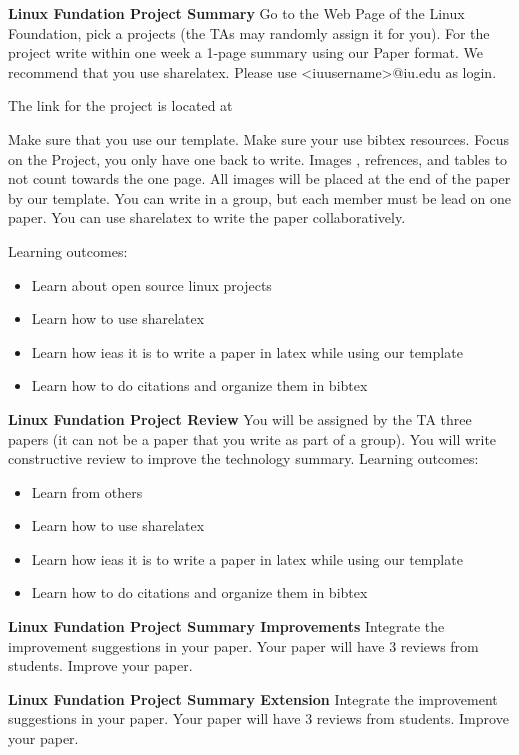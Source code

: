 \begin{exercise} {\bf Linux Fundation Project Summary} 
Go to the Web Page of the Linux Foundation, pick a projects (the TAs
may randomly assign it for you). For the project write within
one week a 1-page summary using our Paper format. We recommend that
you use sharelatex. Please use <iuusername>@iu.edu as login. 

The link for the project is located at

Make sure that you use our template. Make sure your use bibtex
resources. Focus on the Project, you only have one back to
write. Images , refrences, and tables to not count towards the one
page. All images will be placed at the end of the paper by our
template. You can write in a group, but each member must be lead on
one paper. You can use sharelatex to write the paper collaboratively.

Learning outcomes:
\begin{itemize}
\item Learn about open source linux projects
\item Learn how to use sharelatex
\item Learn how ieas it is to write a paper in latex while using our
  template
\item Learn how to do citations and organize them in bibtex
\end{itemize}
\end{exercise} 

\begin{exercise} {\bf Linux Fundation Project Review}
You will be assigned by the TA three papers (it can not be a paper that you
write as part of a group). You will write constructive  review to
improve the technology summary.
Learning outcomes:
\begin{itemize}
\item Learn from others 
\item Learn how to use sharelatex
\item Learn how ieas it is to write a paper in latex while using our
  template
\item Learn how to do citations and organize them in bibtex
\end{itemize}

\end{exercise} 

\begin{exercise} {\bf Linux Fundation Project Summary Improvements}
Integrate the improvement suggestions in your paper. Your paper will
have 3 reviews from students. Improve your paper.
\end{exercise} 

\begin{exercise} {\bf Linux Fundation Project Summary Extension}
Integrate the improvement suggestions in your paper. Your paper will
have 3 reviews from students. Improve your paper.
\end{exercise} 

